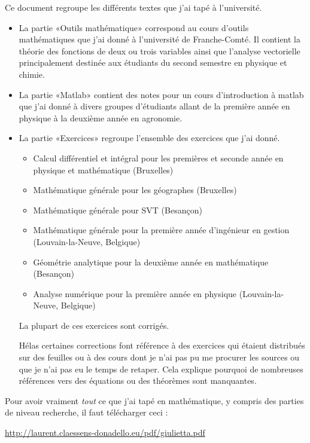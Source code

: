 Ce document regroupe les différents textes que j'ai tapé à l'université.
\begin{itemize}
	\item La partie «Outils mathématique» correspond au cours d'outils mathématiques que j'ai donné à l'université de Franche-Comté. Il contient la théorie des fonctions de deux ou trois variables ainsi que l'analyse vectorielle principalement destinée aux étudiants du second semestre en physique et chimie.
	\item La partie «Matlab» contient des notes pour un cours d'introduction à matlab que j'ai donné à divers groupes d'étudiants allant de la première année en physique à la deuxième année en agronomie.

	\item La partie «Exercices» regroupe l'ensemble des exercices que j'ai donné.

	      \begin{itemize}
		      \item Calcul différentiel et intégral pour les premières et seconde année en physique et mathématique (Bruxelles)
		      \item Mathématique générale pour les géographes (Bruxelles)
		      \item Mathématique générale pour SVT (Besançon)
		      \item Mathématique générale pour la première année d'ingénieur en gestion (Louvain-la-Neuve, Belgique)
		      \item Géométrie analytique pour la deuxième année en mathématique (Besançon)
		      \item Analyse numérique pour la première année en physique (Louvain-la-Neuve, Belgique)
	      \end{itemize}
	      La plupart de ces exercices sont corrigés.

	      Hélas certaines corrections font référence à des exercices qui étaient distribués sur des feuilles ou à des cours dont je n'ai pas pu me procurer les sources ou que je n'ai pas eu le temps de retaper. Cela explique pourquoi de nombreuses références vers des équations ou des théorèmes sont manquantes.
\end{itemize}

\vfill

Pour avoir vraiment \emph{tout} ce que j'ai tapé en mathématique, y compris des parties de niveau recherche, il faut télécharger ceci :
\begin{center}
	\url{http://laurent.claessens-donadello.eu/pdf/giulietta.pdf}
\end{center}

\clearpage

